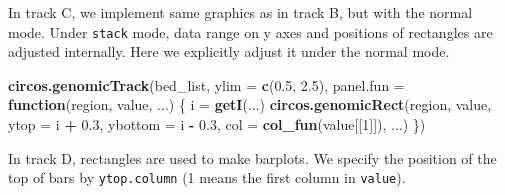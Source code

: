 \documentclass[]{book}
\newenvironment{Shaded}{\begin{snugshade}}{\end{snugshade}}
\newcommand{\KeywordTok}[1]{\textcolor[rgb]{0.13,0.29,0.53}{\textbf{#1}}}
\newcommand{\DataTypeTok}[1]{\textcolor[rgb]{0.13,0.29,0.53}{#1}}
\newcommand{\DecValTok}[1]{\textcolor[rgb]{0.00,0.00,0.81}{#1}}
\newcommand{\FloatTok}[1]{\textcolor[rgb]{0.00,0.00,0.81}{#1}}
\newcommand{\StringTok}[1]{\textcolor[rgb]{0.31,0.60,0.02}{#1}}
\newcommand{\ControlFlowTok}[1]{\textcolor[rgb]{0.13,0.29,0.53}{\textbf{#1}}}
\newcommand{\OperatorTok}[1]{\textcolor[rgb]{0.81,0.36,0.00}{\textbf{#1}}}
\newcommand{\NormalTok}[1]{#1}
\theoremstyle{definition}
\theoremstyle{definition}
\theoremstyle{remark}
\begin{document}
In track C, we implement same graphics as in track B, but with the
normal mode. Under \texttt{stack} mode, data range on y axes and
positions of rectangles are adjusted internally. Here we explicitly
adjust it under the normal mode.

\begin{Shaded}
\begin{Highlighting}[]
\KeywordTok{circos.genomicTrack}\NormalTok{(bed_list, }\DataTypeTok{ylim =} \KeywordTok{c}\NormalTok{(}\FloatTok{0.5}\NormalTok{, }\FloatTok{2.5}\NormalTok{), }
    \DataTypeTok{panel.fun =} \ControlFlowTok{function}\NormalTok{(region, value, ...) \{}
\NormalTok{        i =}\StringTok{ }\KeywordTok{getI}\NormalTok{(...)}
        \KeywordTok{circos.genomicRect}\NormalTok{(region, value, }\DataTypeTok{ytop =}\NormalTok{ i }\OperatorTok{+}\StringTok{ }\FloatTok{0.3}\NormalTok{, }\DataTypeTok{ybottom =}\NormalTok{ i }\OperatorTok{-}\StringTok{ }\FloatTok{0.3}\NormalTok{, }
            \DataTypeTok{col =} \KeywordTok{col_fun}\NormalTok{(value[[}\DecValTok{1}\NormalTok{]]), ...)}
\NormalTok{\})}
\end{Highlighting}
\end{Shaded}

In track D, rectangles are used to make barplots. We specify the
position of the top of bars by \texttt{ytop.column} (1 means the first
column in \texttt{value}).

\begin{Shaded}
\end{Shaded}
\end{document}
